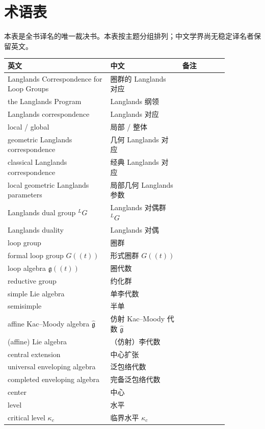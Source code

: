 \chapter{术语表}
本表是全书译名的唯一裁决书。本表按主题分组排列；中文学界尚无稳定译名者保留英文。

\begin{longtable}{p{0.40\linewidth}p{0.28\linewidth}p{0.18\linewidth}}
\toprule
\textbf{英文} & \textbf{中文} & \textbf{备注} \\
\midrule
\endhead
Langlands Correspondence for Loop Groups & 圈群的 Langlands 对应 &  \\
the Langlands Program & Langlands 纲领 &  \\
Langlands correspondence & Langlands 对应 &  \\
local / global & 局部 / 整体 &  \\
geometric Langlands correspondence & 几何 Langlands 对应 &  \\
classical Langlands correspondence & 经典 Langlands 对应 &  \\
local geometric Langlands parameters & 局部几何 Langlands 参数 &  \\
Langlands dual group ${}^L G$ & Langlands 对偶群 ${}^L G$ &  \\
Langlands duality & Langlands 对偶 &  \\
loop group & 圈群 &  \\
formal loop group $G(\!(t)\!)$ & 形式圈群 $G(\!(t)\!)$ &  \\
loop algebra $\mathfrak{g}(\!(t)\!)$ & 圈代数 &  \\
reductive group & 约化群 &  \\
simple Lie algebra & 单李代数 &  \\
semisimple & 半单 &  \\
affine Kac–Moody algebra $\hat{\mathfrak{g}}$ & 仿射 Kac–Moody 代数 $\hat{\mathfrak{g}}$ &  \\
(affine) Lie algebra & （仿射）李代数 &  \\
central extension & 中心扩张 &  \\
universal enveloping algebra & 泛包络代数 &  \\
completed enveloping algebra & 完备泛包络代数 &  \\
center & 中心 &  \\
level & 水平 &  \\
critical level $\kappa_c$ & 临界水平 $\kappa_c$ &  \\

\end{longtable}
